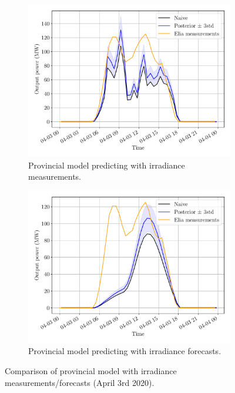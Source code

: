 \documentclass[a4paper, 12pt]{article}
\begin{document}
\begin{figure}[H]
	\centering
	\begin{subfigure}{0.48\textwidth}
		\centering
		\includegraphics[width=\textwidth]{resources/pdf/solar_provincial_meas_meas_START_FOR_03-04-2020.pdf}
		\caption{Provincial model predicting with irradiance measurements.}
		\label{fig:panelwise_meas_meas}
	\end{subfigure}
	\hspace{0.5em}
	\begin{subfigure}{0.48\textwidth}
		\centering
		\includegraphics[width=\textwidth]{resources/pdf/solar_provincial_meas_for_START_FOR_03-04-2020.pdf}
		\caption{Provincial model predicting with irradiance forecasts.}
		\label{fig:panelwise_meas_for}
	\end{subfigure}
	\caption{Comparison of provincial model with irradiance measurements/forecasts (April 3rd 2020).}
	\label{fig:comparison_meas_meas_meas_for_provincial}
\end{figure}
\end{document}
